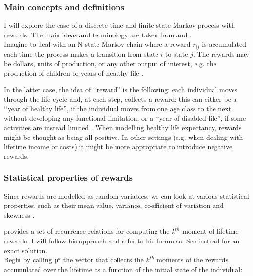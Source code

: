 \documentclass[\main/main.tex]{subfiles}
\begin{document}
\subsubsection{Main concepts and definitions}
I will explore the case of a discrete-time and finite-state Markov process with rewards. The main ideas and terminology are taken from \cite{Howard1960} and \cite{Caswell2011}.\\

\noindent Imagine to deal with an N-state Markov chain where a reward $r_{ij}$ is accumulated each time the process makes a transition from state $i$ to state $j$. The rewards may be dollars, units of production, or any other output of interest, e.g. the production of children \citep{Caswell2011, vanDaalen2015, vanDaalen2017} or years of healthy life \citep{Caswell2018}.

In the latter case, the idea of \lq\lq reward'' is the following: each individual moves through the life cycle and, at each step, collects a reward: this can either be a \lq\lq year of healthy life'', if the individual moves from one age class to the next without developing any functional limitation, or a \lq\lq year of disabled life'', if some activities are instead limited \citep{Caswell2018}. When modelling healthy life expectancy, rewards might be thought as being all positive. In other settings (e.g. when dealing with lifetime income or costs) it might be more appropriate to introduce negative rewards.



\subsubsection{Statistical properties of rewards}

Since rewards are modelled as random variables, we can look at various statistical properties, such as their mean value, variance, coefficient of variation and skewness \citep{Caswell2018}.

\cite{Caswell2011} provides a set of recurrence relations for computing the $k^{th}$ moment of lifetime rewards. I will follow his approach and refer to his formulas. See instead \cite{vanDaalen2015, vanDaalen2017}  for an exact solution.\\

\noindent Begin by calling  $\bm{\rho}^k$ the vector that collects the $k^{th}$ moments of the rewards accumulated over the lifetime as a function of the initial state of the individual:
\end{document}
